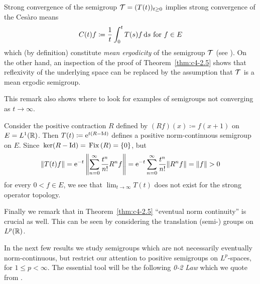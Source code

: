 Strong convergence of the semigroup $\TT = (T(t))_{t \geq 0}$ implies strong convergence of the Cesàro means 
\[
C(t)f \coloneqq  \frac{1}{t}\int_{0}^{t} T(s)f \mathop{}\!\mathrm{d}{s} \text{ for } f \in E
\]
which (by definition) constitute \emph{mean ergodicity} of the semigroup $\mathcal{T}$ (see \textcite[Chap.5.1]{davies:1980}).
On the other hand, an inspection of the proof of Theorem~\ref{thm:c4-2.5} shows that reflexivity of the underlying space can be replaced by the assumption that $\mathcal{T}$ is a mean ergodic semigroup.

This remark also shows where to look for examples of semigroups not converging as $t \to \infty$.

Consider the positive contraction $R$ defined by $(Rf)(x) \coloneqq f(x+1)$ on $E = L^{1}(\mathbb{R})$.
Then $T(t) \coloneqq \mathrm{e}^{t(R-\operatorname{Id})}$ defines a positive norm-continuous semigroup on $E$.
Since $\mathop{}\mathrm{ker}(R - \operatorname{Id}) = \mathop{}\mathrm{Fix}\left(R\right) = \{0\}$, but 
\[
\|T(t)f\| = \mathrm{e}^{-t} \left\|\sum_{n=0}^{\infty} \frac{t^n}{n!}R^{n}f\right\| = 
\mathrm{e}^{-t}\sum_{n=0}^{\infty} \frac{t^n}{n!}\|R^{n}f\|= \|f\| > 0
\] 
for every $0 < f \in E$, we see that $\lim_{t\to\infty} T(t)$ does not exist for the strong operator topology.

Finally we remark that in Theorem~\ref{thm:c4-2.5} \enquote{eventual norm continuity} is crucial as well.
This can be seen by considering the translation (semi-) groups on $L^{p}(\mathbb{R})$.

In the next few results we study semigroups which are not necessarily eventually norm-continuous, but restrict our attention to positive semigroups on $L^{p}$-spaces, for $1 \leq p < \infty$.
The essential tool will be the following \emph{0-2 Law} which we quote from \textcite[Theorem~3.7]{greiner:1982}.

